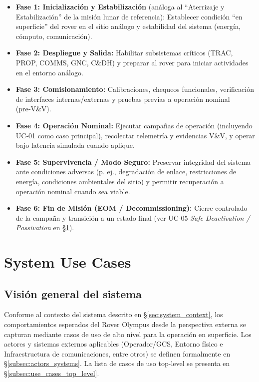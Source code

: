 \begin{itemize}
    \item \textbf{Fase 1: Inicialización y Estabilización} (análoga al ``Aterrizaje y Estabilización'' de la misión lunar de referencia): Establecer condición ``en superficie'' del rover en el sitio análogo y estabilidad del sistema (energía, cómputo, comunicación).
    \item \textbf{Fase 2: Despliegue y Salida:} Habilitar subsistemas críticos (TRAC, PROP, COMMS, GNC, C\&DH) y preparar al rover para iniciar actividades en el entorno análogo.
    \item \textbf{Fase 3: Comisionamiento:} Calibraciones, chequeos funcionales, verificación de interfaces internas/externas y pruebas previas a operación nominal (pre‑V\&V).
    \item \textbf{Fase 4: Operación Nominal:} Ejecutar campañas de operación (incluyendo UC‑01 como caso principal), recolectar telemetría y evidencias V\&V, y operar bajo latencia simulada cuando aplique.
    \item \textbf{Fase 5: Supervivencia / Modo Seguro:} Preservar integridad del sistema ante condiciones adversas (p. ej., degradación de enlace, restricciones de energía, condiciones ambientales del sitio) y permitir recuperación a operación nominal cuando sea viable.
    \item \textbf{Fase 6: Fin de Misión (EOM / Decommissioning):} Cierre controlado de la campaña y transición a un estado final (ver UC-05 \emph{Safe Deactivation / Passivation} en \S\ref{sec:use_cases}).
\end{itemize}

\section{System Use Cases}\label{sec:use_cases}

\subsection{Visión general del sistema}\label{subsec:use_cases_overview}
Conforme al contexto del sistema descrito en §\ref{sec:system_context}, los comportamientos esperados del Rover Olympus desde la perspectiva externa se capturan mediante casos de uso de alto nivel para la operación en superficie. Los actores y sistemas externos aplicables (Operador/GCS, Entorno físico e Infraestructura de comunicaciones, entre otros) se definen formalmente en §\ref{subsec:actors_systems}. La lista de casos de uso top-level se presenta en §\ref{subsec:use_cases_top_level}.

